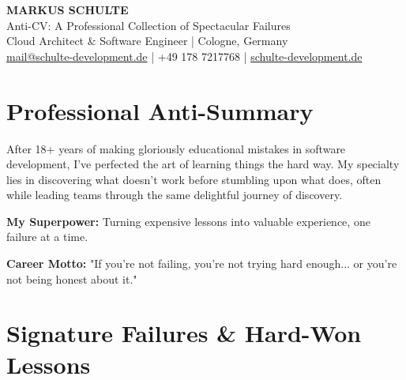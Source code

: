 \documentclass[10pt,a4paper]{article}
\begin{document}
\begin{center}
{\Huge\bfseries\sffamily\color{darkblue} MARKUS SCHULTE}\\[0.3em]
{\Large\sffamily Anti-CV: A Professional Collection of Spectacular Failures}\\[0.5em]
{\large\sffamily Cloud Architect \& Software Engineer | Cologne, Germany}\\[0.3em]
\href{mailto:mail@schulte-development.de}{mail@schulte-development.de} | +49 178 7217768 | \href{https://schulte-development.de}{schulte-development.de}
\end{center}

\vspace{0.5em}

\section{Professional Anti-Summary}

After 18+ years of making gloriously educational mistakes in software development, I've perfected the art of learning things the hard way. My specialty lies in discovering what doesn't work before stumbling upon what does, often while leading teams through the same delightful journey of discovery.

\textbf{My Superpower:} Turning expensive lessons into valuable experience, one failure at a time.

\textbf{Career Motto:} "If you're not failing, you're not trying hard enough... or you're not being honest about it."

\section{Signature Failures \& Hard-Won Lessons}
\end{document}
